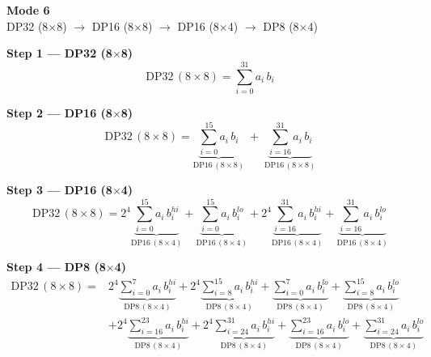 \documentclass[fleqn]{article}
\newcommand{\DPop}[3]{\mathrm{DP#1}\,(#2\!\times\!#3)}
\begin{document}
\begin{center}
{\LARGE \textbf{Mode 6}}\\[4pt]
{\large DP32 (8$\times$8) $\rightarrow$ DP16 (8$\times$8) $\rightarrow$ DP16 (8$\times$4) $\rightarrow$ DP8 (8$\times$4)}
\end{center}

\vspace{4em}

\noindent\textbf{Step 1 --- DP32 (8$\times$8)}
\[
\DPop{32}{8}{8} = \sum_{i=0}^{31} a_i \, b_i
\]

\vspace{0.5em}

\noindent\textbf{Step 2 --- DP16 (8$\times$8)}
\[
\DPop{32}{8}{8}
  = \underbrace{\sum_{i=0}^{15} a_i \, b_i}_{\DPop{16}{8}{8}}
  \; + \; \underbrace{\sum_{i=16}^{31} a_i \, b_i}_{\DPop{16}{8}{8}}
\]

\vspace{0.5em}

\noindent\textbf{Step 3 --- DP16 (8$\times$4)}
\[
\DPop{32}{8}{8}
  = 2^{4} \underbrace{\sum_{i=0}^{15} a_i \, b_i^{hi}}_{\DPop{16}{8}{4}}
  + \underbrace{\sum_{i=0}^{15} a_i \, b_i^{lo}}_{\DPop{16}{8}{4}}
  + 2^{4} \underbrace{\sum_{i=16}^{31} a_i \, b_i^{hi}}_{\DPop{16}{8}{4}}
  + \underbrace{\sum_{i=16}^{31} a_i \, b_i^{lo}}_{\DPop{16}{8}{4}}
\]

\vspace{0.5em}

\noindent\textbf{Step 4 --- DP8 (8$\times$4)}
\begin{align*}
\DPop{32}{8}{8} = {}
  & 2^{4} \underbrace{\sum_{i=0}^{7} a_i \, b_i^{hi}}_{\DPop{8}{8}{4}}
  + 2^{4} \underbrace{\sum_{i=8}^{15} a_i \, b_i^{hi}}_{\DPop{8}{8}{4}}
  + \underbrace{\sum_{i=0}^{7} a_i \, b_i^{lo}}_{\DPop{8}{8}{4}}
  + \underbrace{\sum_{i=8}^{15} a_i \, b_i^{lo}}_{\DPop{8}{8}{4}} \\[1em]
  & + 2^{4} \underbrace{\sum_{i=16}^{23} a_i \, b_i^{hi}}_{\DPop{8}{8}{4}}
  + 2^{4} \underbrace{\sum_{i=24}^{31} a_i \, b_i^{hi}}_{\DPop{8}{8}{4}}
  + \underbrace{\sum_{i=16}^{23} a_i \, b_i^{lo}}_{\DPop{8}{8}{4}}
  + \underbrace{\sum_{i=24}^{31} a_i \, b_i^{lo}}_{\DPop{8}{8}{4}}
\end{align*}
\end{document}
